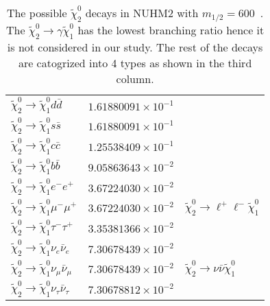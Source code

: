 \begin{table}[htb]
\begin{center}
{\begin{tabular}{lll}
                $\widetilde{\chi}_{2}^{0} \to \widetilde{\chi}_{1}^{0} d \bar{d}$                   & $1.61880091\times 10^{-1}$ & \\
                $\widetilde{\chi}_{2}^{0} \to \widetilde{\chi}_{1}^{0} s \bar{s}$                   & $1.61880091\times 10^{-1}$ & \\
                $\widetilde{\chi}_{2}^{0} \to \widetilde{\chi}_{1}^{0} c \bar{c}$                   & $1.25538409\times 10^{-1}$ & \\
                $\widetilde{\chi}_{2}^{0} \to \widetilde{\chi}_{1}^{0} b \bar{b}$                   & $9.05863643\times 10^{-2}$ & \\
                \hline
                $\widetilde{\chi}_{2}^{0} \to \widetilde{\chi}_{1}^{0} e^{-} e^{+}$                 & $3.67224030\times 10^{-2}$ & \multirow{3}{*}{$\widetilde{\chi}^{0}_{2} \to \ell^{+} \ell^{-} \widetilde{\chi}^{0}_{1}$}\\
                $\widetilde{\chi}_{2}^{0} \to \widetilde{\chi}_{1}^{0} \mu^{-} \mu^{+}$             & $3.67224030\times 10^{-2}$ & \\
                $\widetilde{\chi}_{2}^{0} \to \widetilde{\chi}_{1}^{0} \tau^{-} \tau^{+}$           & $3.35381366\times 10^{-2}$ & \\
                \hline
                $\widetilde{\chi}_{2}^{0} \to \widetilde{\chi}_{1}^{0} \nu_{e} \bar{\nu}_{e}$       & $7.30678439\times 10^{-2}$ & \multirow{3}{*}{$\widetilde{\chi}^{0}_{2} \to \nu \bar{\nu} \widetilde{\chi}^{0}_{1}$}\\
                $\widetilde{\chi}_{2}^{0} \to \widetilde{\chi}_{1}^{0} \nu_{\mu} \bar{\nu}_{\mu}$   & $7.30678439\times 10^{-2}$ & \\
                $\widetilde{\chi}_{2}^{0} \to \widetilde{\chi}_{1}^{0} \nu_{\tau} \bar{\nu}_{\tau}$ & $7.30678812\times 10^{-2}$ & \\
                \hline
                \hline
            \end{tabular}
        }
    \end{center}
    \caption{The possible $\widetilde{\chi}^{0}_{2}$ decays in NUHM2 with $m_{1/2}=600$~{\GeV}.
    The $\widetilde{\chi}_{2}^{0} \to \gamma \widetilde{\chi}^{0}_{1}$ has the lowest branching ratio hence it is not considered in our study.
    The rest of the decays are catogrized into 4 types as shown in the third column.}
    \label{tab:data_NUHM2_n2_decays}
\end{table}%

